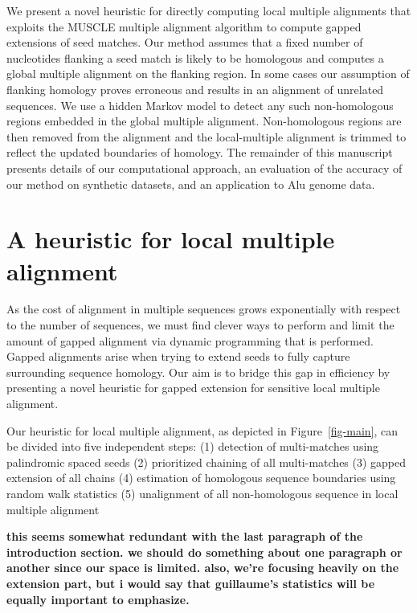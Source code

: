\documentclass{ws-procs9x6}
\begin{document}
We present a novel heuristic for directly computing local multiple alignments that exploits the MUSCLE multiple alignment algorithm to compute gapped extensions of seed matches.  Our method assumes that a fixed number of nucleotides flanking a seed match is likely to be homologous and computes a global multiple alignment on the flanking region.  In some cases our assumption of flanking homology proves erroneous and results in an alignment of unrelated sequences.  We use a hidden Markov model to detect any such non-homologous regions embedded in the global multiple alignment.  Non-homologous regions are then removed from the alignment and the local-multiple alignment is trimmed to reflect the updated boundaries of homology.  The remainder of this manuscript presents details of our computational approach, an evaluation of the accuracy of our method on synthetic datasets, and an application to Alu genome data.



\section{A heuristic for local multiple alignment}
As the cost of alignment in multiple sequences grows exponentially with respect to the number of sequences, we must find clever ways to perform and limit the amount of gapped alignment via dynamic programming that is performed. Gapped alignments arise when trying to extend seeds to fully capture surrounding sequence homology. Our aim is to bridge this gap in efficiency by presenting a novel heuristic for gapped extension for sensitive local multiple alignment.

Our heuristic for local multiple alignment, as depicted in Figure~\ref{fig-main},
can be divided into five independent steps:
(1) detection of multi-matches using palindromic spaced seeds
(2) prioritized chaining of all multi-matches
(3) gapped extension of all chains
(4) estimation of homologous sequence boundaries using random walk statistics
(5) unalignment of all non-homologous sequence in local multiple alignment

\textbf{this seems somewhat redundant with the last paragraph of the introduction section.  we should do something about one paragraph or another since our space is limited.  also, we're focusing heavily on the extension part, but i would say that guillaume's statistics will be equally important to emphasize.}
\end{document}
